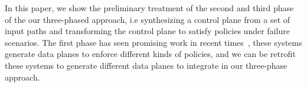In this paper, we show the preliminary treatment 
of the second and third phase of the our three-phased
approach, i.e synthesizing a control plane from a set 
of input paths and transforming the control plane to 
satisfy policies under failure scenarios. The first 
phase has seen promising work in recent times~\cite{merlin,
simple}, these systems generate data planes to enforce 
different kinds of policies, and 
we can be retrofit these systems to generate different 
data planes to integrate in our three-phase approach.



